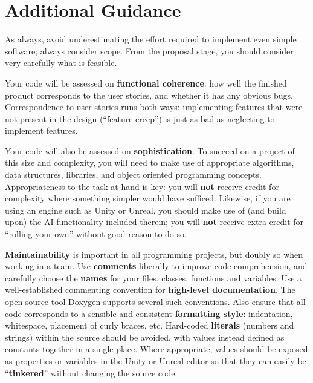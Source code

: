 \section*{Additional Guidance}

As always, avoid underestimating the effort required to implement even simple software; always consider scope.
From the proposal stage, you should consider very carefully what is feasible.

Your code will be assessed on \textbf{functional coherence}:
how well the finished product corresponds to the user stories,
and whether it has any obvious bugs.
Correspondence to user stories runs both ways:
implementing features that were not present in the design (``feature creep'')
is just as bad as neglecting to implement features.


Your code will also be assessed on \textbf{sophistication}.
To succeed on a project of this size and complexity,
you will need to make use of appropriate algorithms, data structures, libraries, and object oriented programming concepts.
Appropriateness to the task at hand is key:
you will \textbf{not} receive credit for complexity  
where something simpler would have sufficed.
Likewise, if you are using an engine such as Unity or Unreal,
you should make use of (and build upon) the AI functionality included therein;
you will \textbf{not} receive extra credit for ``rolling your own'' without good reason to do so.

\textbf{Maintainability} is important in all programming projects,
but doubly so when working in a team.
Use \textbf{comments} liberally to improve code comprehension,
and carefully choose the \textbf{names} for your files, classes, functions and variables.
Use a well-established commenting convention
for \textbf{high-level documentation}.
The open-source tool Doxygen supports several such conventions.
Also ensure that all code corresponds to a sensible and consistent \textbf{formatting style}:
indentation, whitespace, placement of curly braces, etc.
Hard-coded \textbf{literals} (numbers and strings) within the source should be avoided,
with values instead defined as constants together in a single place.
Where appropriate, values should be exposed as properties or variables in the Unity or Unreal editor
so that they can easily be ``\textbf{tinkered}'' without changing the source code.

